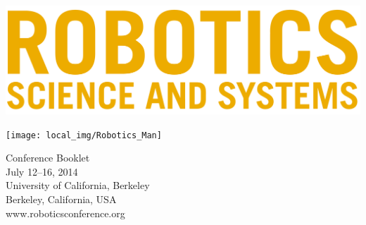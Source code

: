 \documentclass[9pt, twoside, openany]{extbook}
\begin{document}

\pagestyle{plain}


\renewcommand{\chaptername}{}

\thispagestyle{empty}

\centerline{\includegraphics[width=15cm]{local_img/rss-title}}

\vspace{0.3cm}

\centerline{\texttt{[image: local\_img/Robotics\_Man]}}

\begin{center}
{\Large Conference Booklet} \\[0.3cm]
       July 12--16, 2014 \\
       University of California, Berkeley\\
       Berkeley, California, USA\\
       www.roboticsconference.org
\end{center}

\clearpage
\pagestyle{front}


% 

\newpage

\thispagestyle{empty}
\mbox{}
\setcounter{page}{0}


\clearpage
\setcounter{tocdepth}{1}
\begingroup
  {\sf \small 
  \tableofcontents}
\endgroup

\clearpage
\pagestyle{default}


\end{document}
